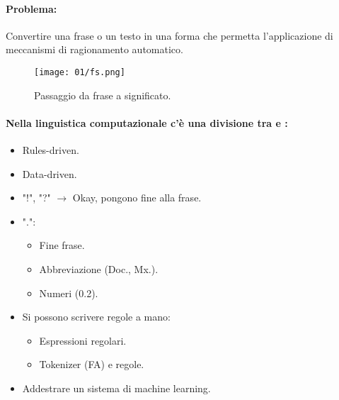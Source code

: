 \paragraph{Problema:} Convertire una frase o un testo in una forma che permetta l'applicazione di meccanismi di ragionamento automatico.

\begin{figure}[h]
    \centering
    \texttt{[image: 01/fs.png]}
    \caption{Passaggio da frase a significato.}
\end{figure}


\paragraph{Nella linguistica computazionale c'è una divisione tra  e :}

\begin{itemize}
  \item Rules-driven. 
  \item Data-driven.
\end{itemize}




\begin{itemize}
  \item "!", "?" $\rightarrow$ Okay, pongono fine alla frase.
  \item ".":
    \begin{itemize}
      \item Fine frase. 
      \item Abbreviazione (Doc., Mx.). 
      \item Numeri (0.2).
    \end{itemize}
\end{itemize}


\begin{itemize}
  \item Si possono scrivere regole a mano: 
    \begin{itemize}
      \item Espressioni regolari. 
      \item Tokenizer (FA) e regole.
    \end{itemize}
  \item Addestrare un sistema di machine learning.
\end{itemize}

